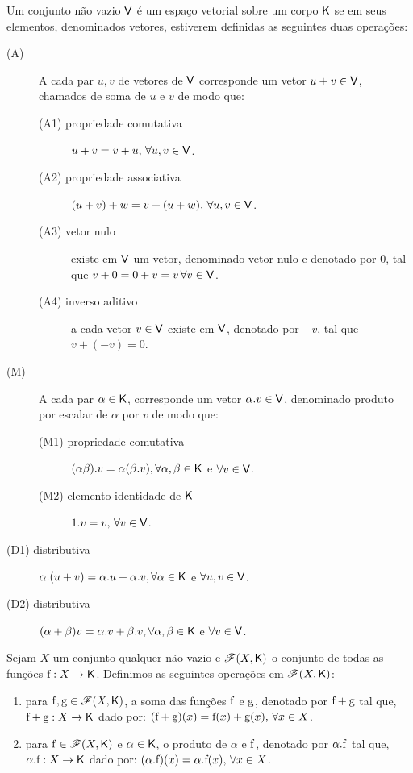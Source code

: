 \documentclass[10pt,a4paper]{book}
\begin{document}
\begin{definition}
	Um conjunto não vazio $\mathsf{ V }$ é um espaço vetorial sobre um corpo $\mathsf{ K }$ se em seus elementos, denominados vetores, estiverem definidas as seguintes duas operações:
	\begin{description}
		\item[(A)] A cada par $u, v$ de vetores de $\mathsf{ V }$ corresponde um vetor $u + v \in \mathsf{ V }$, chamados de soma de $u$ e $v$ de modo que:
		\begin{description}
			\item[(A1) propriedade comutativa ] $u + v = v + u, \, \forall u, v \in \mathsf{ V }$.
			\item[(A2) propriedade associativa] $(u + v) + w = v + (u + w), \, \forall u, v \in \mathsf{ V }$.
			\item[(A3) vetor nulo             ] existe em $\mathsf{ V }$ um vetor, denominado vetor nulo e denotado por $0$, tal que $v + 0 = 0 + v = v \, \forall v \in \mathsf{ V }$.
			\item[(A4) inverso aditivo        ] a cada vetor $v \in \mathsf{ V }$ existe em $\mathsf{ V }$, denotado por $-v$, tal que $v + (-v) = 0$.
		\end{description}
		\item[(M)] A cada par $\alpha \in \mathsf{ K }$, corresponde um vetor $\alpha . v \in \mathsf{ V }$, denominado produto por escalar de $\alpha$ por $v$ de modo que:
		\begin{description}
			\item[(M1) propriedade comutativa      ] $(\alpha \beta).v = \alpha (\beta . v), \forall \alpha, \beta \in \mathsf{ K }$ e $\forall v \in \mathsf{ V }$.
			\item[(M2) elemento identidade de $\mathsf{ K }$] $1 . v = v, \, \forall v \in \mathsf{ V }$.
		\end{description}
		\item[(D1) distributiva] $\alpha . (u + v) = \alpha . u + \alpha . v, \forall \alpha \in \mathsf{ K }$ e $\forall u, v \in \mathsf{ V }$.
		\item[(D2) distributiva] $(\alpha + \beta) v = \alpha . v + \beta . v, \forall \alpha, \beta \in \mathsf{ K }$ e $\forall v \in \mathsf{ V }$.
	\end{description}
\end{definition}

\begin{definition}
	Sejam $X$ um conjunto qualquer não vazio e $\mathscr{ F }(X, \mathsf{ K })$ o conjunto de todas as funções $\mathrm{ f }: X \rightarrow \mathsf{ K }$. Definimos as seguintes operações em $\mathscr{ F }(X, \mathsf{ K })$:
	\begin{enumerate}
		\item para $\mathrm{ f }, \mathrm{ g } \in \mathscr{ F }(X, \mathsf{ K })$, a soma das funções $\mathrm{ f }$ e $\mathrm{ g }$, denotado por $\mathrm{ f } + \mathrm{ g }$ tal que, $\mathrm{ f } + \mathrm{ g } : X \rightarrow \mathsf{ K }$ dado por: $(\mathrm{ f } + \mathrm{ g })(x) = \mathrm{ f }(x) + \mathrm{ g }(x), \, \forall x \in X$.
		\item para $\mathrm{ f } \in \mathscr{ F }(X, \mathsf{ K })$ e $\alpha \in \mathsf{ K }$, o produto de $\alpha$ e $\mathrm{ f }$, denotado por $\alpha . \mathrm{ f }$ tal que, $\alpha . \mathrm{ f } : X \rightarrow \mathsf{ K }$ dado por: $(\alpha . \mathrm{ f })(x) = \alpha . \mathrm{ f }(x), \, \forall x \in X$.
	\end{enumerate}
\end{definition}
\end{document}
